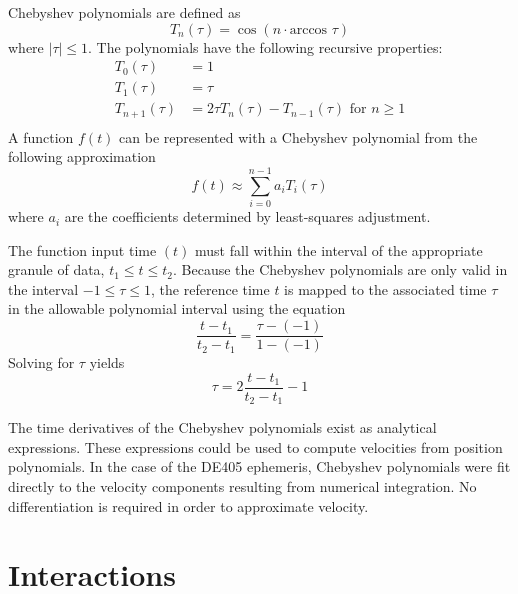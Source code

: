 Chebyshev polynomials are defined as
\begin{equation}
T_n(\tau)=\cos(n\cdot \mbox{arccos } \tau)
\label{cheb_poly}
\end{equation}
where $|\tau | \le 1$.  The polynomials have the following recursive
properties:
\begin{equation}
\begin{aligned}
T_0(\tau) &= 1 \\
T_1(\tau) &= \tau \\
T_{n+1}(\tau) &= 2\tau T_n(\tau)-T_{n-1}(\tau) \mbox{   for   } n\ge 1\\
\end{aligned}
\label{cheb_recursive}
\end{equation}
A function $f(t)$ can be represented with a Chebyshev polynomial from the 
following approximation
\begin{equation}
f(t)\approx\sum^{n-1}_{i=0} a_i T_i(\tau)
\end{equation}
where $a_i$ are the coefficients determined by least-squares adjustment.

The function input time $(t)$ must fall within the interval of the 
appropriate granule of data, $t_1\le t \le t_2$.  Because the Chebyshev 
polynomials are only valid in the interval $-1\le \tau \le 1$, the reference 
time $t$ is mapped to the associated time $\tau$ in the allowable polynomial 
interval using the equation
\begin{equation}
\frac{t-t_1}{t_2-t_1}=\frac{\tau - (-1)}{1-(-1)}
\end{equation}
Solving for $\tau$ yields
\begin{equation}
\tau=2 \frac{t-t_1}{t_2-t_1}-1
\end{equation}

The time derivatives of the Chebyshev polynomials exist as analytical 
expressions.  These expressions could be used to compute velocities 
from position polynomials.  In the case of the DE405 ephemeris, 
Chebyshev polynomials were fit directly to the velocity components 
resulting from numerical integration. No differentiation is required in 
order to approximate velocity.

\section{Interactions}
\label{sec:interactions}

